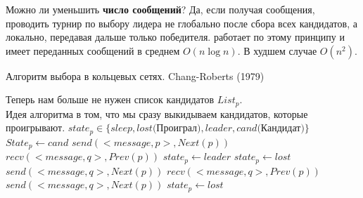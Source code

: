Можно ли уменьшить \textbf{число сообщений}? Да, если получая сообщения, проводить турнир по выбору лидера не глобально после сбора всех кандидатов, а локально, передавая дальше только победителя.  работает по этому принципу и имеет переданных сообщений в среднем $O(n\log n)$. В худшем случае $O(n^2)$.
\begin{algorithm}
\caption{Алгоритм выбора в кольцевых сетях. Chang-Roberts (1979)}
\label{algRoberts}
\begin{algorithmic}
\State Теперь нам больше не нужен список кандидатов $List_p$.\\ Идея алгоритма в том, что мы сразу выкидываем кандидатов, которые проигрывают.
\State $state_p \in \{sleep, lost\text{(Проиграл)}, leader, cand\text{(Кандидат)}\}$ 
    \State $State_p \gets cand$
    \State $send(<message, p>, Next(p))$ 
        \State $recv(<message, q>, Prev(p))$ 
            $state_p \gets leader$
         
                \State $state_p \gets lost$
                \State $send(<message, q>, Next(p))$
            \EndIf
        \EndIf
    \EndWhile
\Else[Не инициаторы] 
        \State $recv(<message, q>, Prev(p))$ 
        \State $send(<message, q>, Next(p))$ 
            \State $state_p \gets lost$
        \EndIf
    \EndWhile
\EndIf 
\end{algorithmic}
\end{algorithm}


